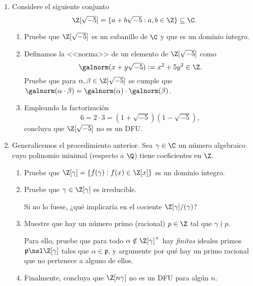 \documentclass[11pt, reqno]{amsart}
\begin{document}
\begin{enumerate}[resume]
	\item Considere el siguiente conjunto
		\[
			\Z[\sqrt{-5}] = \{ a + b \sqrt{-5} : a, b \in \Z \} \subseteq \C.
		\]
		\begin{enumerate}
			\item Pruebe que $\Z[\sqrt{-5}]$ es un subanillo de $\C$ y que es un dominio íntegro.
			\item Definamos la <<norma>> de un elemento de $\Z[\sqrt{-5}]$ como
				\[
					\galnorm(x + y \sqrt{-5}) := x^2 + 5y^2 \in \Z.
				\]
				Pruebe que para $\alpha, \beta \in \Z[\sqrt{-5}]$ se cumple que $\galnorm(\alpha \cdot \beta) =
				\galnorm(\alpha) \cdot \galnorm(\beta)$.
			\item Empleando la factorización
				\[
					6 = 2\cdot 3 = (1 + \sqrt{-5})(1 - \sqrt{-5}),
				\]
				concluya que $\Z[\sqrt{-5}]$ no es un DFU.
		\end{enumerate}

	\item\label{ex:non_UFD_machine}\lookst
		Generalicemos el procedimiento anterior.
		Sea $\gamma \in \C$ un número algebraico
		cuyo polinomio minimal (respecto a $\Q$) tiene
		coeficientes en $\Z$.
		\begin{enumerate}
			\item Pruebe que $\Z[\gamma] = \{ f(\gamma) : f(x) \in \Z[x] \}$ es un dominio íntegro.
			\item Pruebe que $\gamma \in \Z[\gamma]$ es irreducible.
				
				\begin{hint}
					Si no lo fuese, ¿qué implicaría en el cociente $\Z[\gamma]/(\gamma)$?
				\end{hint}
			\item Muestre que hay un número primo (racional) $p \in \Z$ tal que $\gamma \nmid p$.

				\begin{hint}
					Para ello, pruebe que para todo $\alpha \notin \Z[\gamma]^\times$ hay \emph{finitos} ideales primos
					$\mathfrak{p} \nsl \Z[\gamma]$ tales que $\alpha \in \mathfrak{p}$, y argumente por qué hay un primo
					racional que no pertenece a alguno de ellos.
				\end{hint}
			\item Finalmente, concluya que $\Z[n \gamma]$ no es un DFU para algún $n$.
		\end{enumerate}
\end{enumerate}
\end{document}
